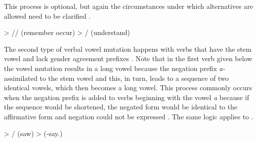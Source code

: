 This process is optional, but again the circumstances under which alternatives are allowed need to be clarified .
%
\begin{exe}
	\ex	\label{ex:does not understand phon}
	\begin{xlist}
		\ex	{} > \slash{}\slash{}  (remember occur)  
		\ex	{} > \slash{} \newline\hspace*{1em}(understand)
	\end{xlist}
\end{exe}
%
The second type of verbal vowel mutation happens with verbs that have the stem vowel  and lack gender agreement prefixes . Note that in the first verb given below the vowel mutation results in a long vowel because the negation prefix \textit{a-} assimilated to the stem vowel and this, in turn, leads to a sequence of two identical vowels, which then becomes a long vowel. This process commonly occurs when the negation prefix is added to verbs beginning with the vowel \textit{a} because if the sequence would be shortened, the negated form would be identical to the affirmative form and negation could not be expressed . The same logic applies to  .
%
\begin{exe}
	\label{ex:a e e phon}
	\begin{xlist}
		\ex	\label{ex:sawPHON}  > \slash{} (saw\tsc{.pfv-pret})
		\ex	{} >  (-say.\tsc{ipfv-icvb})
	\end{xlist}
\end{exe}


